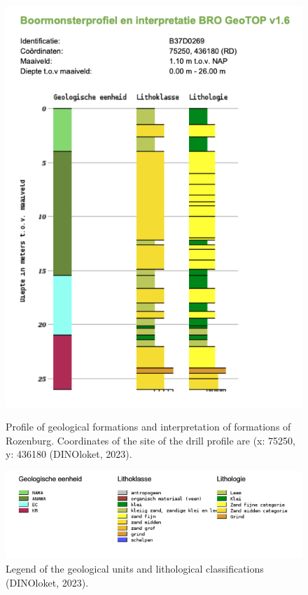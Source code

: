 \\
\begin{figure}[h]
    \centering
    \begin{minipage}{0.30\linewidth}
        \includegraphics[width=\linewidth]{figures/roz/boor.png}
        \caption{Profile of geological formations and interpretation of formations of Rozenburg. Coordinates of the site of the drill profile are (x: 75250, y: 436180 (DINOloket, 2023).}
    \end{minipage}
    \hfill
    \begin{minipage}{0.60\linewidth}
        \includegraphics[width=\linewidth]{figures/roz/litho.png}
        \caption{Legend of the geological units and lithological classifications (DINOloket, 2023).}
    \end{minipage}
\end{figure}\\
